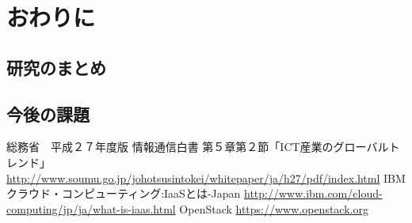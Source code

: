 \documentclass[mingoth]{kut-paper}		%
\begin{document}
\chapter{おわりに}
	\section{研究のまとめ}
	\section{今後の課題}
	


\begin{acknowledgement}
%
\end{acknowledgement}


\begin{thebibliography}{99}
%
総務省　平成２７年度版 情報通信白書 第５章第２節「ICT産業のグローバルトレンド」 				\url{http://www.soumu.go.jp/johotsusintokei/whitepaper/ja/h27/pdf/index.html}
IBMクラウド・コンピューティング:IaaSとは-Japan
\url{http://www.ibm.com/cloud-computing/jp/ja/what-is-iaas.html}
OpenStack
\url{https://www.openstack.org}
\end{thebibliography}


\appendix

\chapter{}
%

\chapter{}
%
\end{document}
